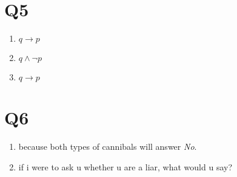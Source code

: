 \documentclass[11pt]{article}
\newenvironment{qparts}{\begin{enumerate}[{(}a{)}]}{\end{enumerate}}
\begin{document}
\section*{Q5}
\begin{qparts}
    \item $q \to p$
    \item $q \land \lnot p$
    \item $q \to p$
\end{qparts}

\section*{Q6}
\begin{qparts}
    \item because both types of cannibals will answer \emph{No}.
    \item if i were to ask u whether u are a liar, what would u say?
\end{qparts}
\end{document}

